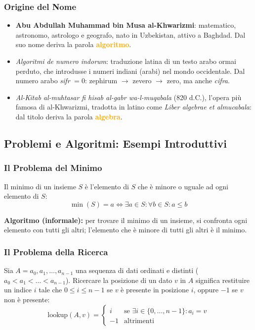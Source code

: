 \documentclass[12pt, a4paper]{article}
\begin{document}
\subsubsection{Origine del Nome}

\begin{itemize}
    \item \textbf{Abu Abdullah Muhammad bin Musa al-Khwarizmi}: matematico, astronomo, astrologo e geografo, nato in Uzbekistan, attivo a Baghdad. Dal suo nome deriva la parola \textcolor{orange}{\textbf{algoritmo}}.
    \item \textit{Algoritmi de numero indorum}: traduzione latina di un testo arabo ormai perduto, che introdusse i numeri indiani (arabi) nel mondo occidentale. Dal numero arabo \textit{sifr} $=0$: zephirum $\to$ zevero $\to$ zero, ma anche \textit{cifra}.
    \item \textit{Al-Kitab al-muhtasar fi hisab al-gabr wa-l-muqabala} (820 d.C.), l'opera più famosa di al-Khwarizmi, tradotta in latino come \textit{Liber algebrae et almucabala}: dal titolo deriva la parola \textcolor{orange}{\textbf{algebra}}.
\end{itemize}

\subsection{Problemi e Algoritmi: Esempi Introduttivi}

\subsubsection{Il Problema del Minimo}

Il minimo di un insieme $S$ è l'elemento di $S$ che è minore o uguale ad ogni elemento di $S$:
$$\min(S) = a \iff \exists a \in S : \forall b \in S : a \le b$$

\textbf{Algoritmo (informale):} per trovare il minimo di un insieme, si confronta ogni elemento con tutti gli altri; l'elemento che è minore di tutti gli altri è il minimo.

\subsubsection{Il Problema della Ricerca}

Sia $A = a_0, a_1, \dots, a_{n-1}$ una sequenza di dati ordinati e distinti ($a_0 < a_1 < \dots < a_{n-1}$). Ricercare la posizione di un dato $v$ in $A$ significa restituire un indice $i$ tale che $0 \le i \le n-1$ se $v$ è presente in posizione $i$, oppure $-1$ se $v$ non è presente:
$$\text{lookup}(A,v) = \begin{cases} i & \text{se } \exists i \in \{0,\dots,n-1\} : a_i = v \\ -1 & \text{altrimenti} \end{cases}$$
\end{document}
